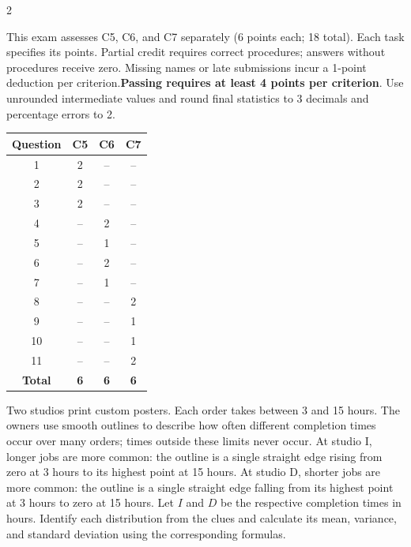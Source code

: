 \vspace{0.1cm}
\StudentInfo
\vspace{-3mm}
\begin{multicols}{2}
	\raggedcolumns
	
\vspace{-0.2cm}
This exam assesses C5, C6, and C7 separately (6 points each; 18 total). Each task specifies its points. Partial credit requires correct procedures; answers without procedures receive zero. Missing names or late submissions incur a 1-point deduction per criterion.\textbf{Passing requires at least 4 points per criterion}. Use unrounded intermediate values and round final statistics to 3 decimals and percentage errors to 2.

\vspace{-9mm}
\begin{center}
	\begin{tabular}{|c|c|c|c|}
		\hline
		\textbf{Question} & \textbf{C5} & \textbf{C6} & \textbf{C7} \\ \hline
		1  & 2  & -- & -- \\ \hline
		2  & 2  & -- & -- \\ \hline
		3  & 2  & -- & -- \\ \hline
		4  & -- & 2  & -- \\ \hline
		5  & -- & 1  & -- \\ \hline
		6  & -- & 2  & -- \\ \hline
		7  & -- & 1  & -- \\ \hline
		8  & -- & -- & 2  \\ \hline
		9  & -- & -- & 1  \\ \hline
		10 & -- & -- & 1  \\ \hline
		11 & -- & -- & 2  \\ \hline
		\textbf{Total} & \textbf{6} & \textbf{6} & \textbf{6} \\ \hline
	\end{tabular}
\end{center}


\label{sec:c5-1}
Two studios print custom posters. Each order takes between 3 and 15 hours.
The owners use smooth outlines to describe how often different completion times
occur over many orders; times outside these limits never occur.
At studio I, longer jobs are more common: the outline is a single straight
edge rising from zero at 3 hours to its highest point at 15 hours.
At studio D, shorter jobs are more common: the outline is a single straight
edge falling from its highest point at 3 hours to zero at 15 hours.
Let $I$ and $D$ be the respective completion times in hours.
Identify each distribution from the clues and calculate its mean, variance, and standard deviation using the corresponding formulas. 



\end{multicols}
